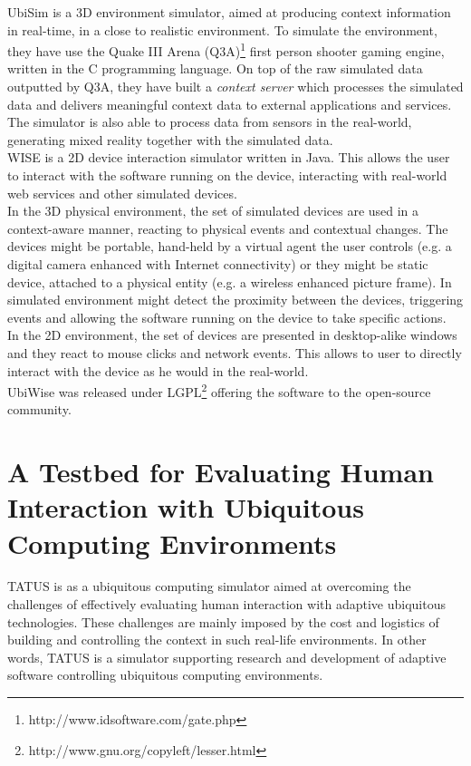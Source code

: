 UbiSim is a 3D environment simulator, aimed at producing context information in real-time, in a close to realistic environment. To simulate the environment, they have use the Quake III Arena (Q3A)\footnote{http://www.idsoftware.com/gate.php} first person shooter gaming engine, written in the C programming language. On top of the raw simulated data outputted by Q3A, they have built a \emph{context server} which processes the simulated data and delivers meaningful context data to external applications and services. The simulator is also able to process data from sensors in the real-world, generating mixed reality together with the simulated data.\\

WISE is a 2D device interaction simulator written in Java. This allows the user to interact with the software running on the device, interacting with real-world web services and other simulated devices.\\

In the 3D physical environment, the set of simulated devices are used in a context-aware manner, reacting to physical events and contextual changes. The devices might be portable, hand-held by a virtual agent the user controls (e.g. a digital camera enhanced with Internet connectivity) or they might be static device, attached to a physical entity (e.g. a wireless enhanced picture frame). In simulated environment might detect the proximity between the devices, triggering events and allowing the software running on the device to take specific actions.\\

In the 2D environment, the set of devices are presented in desktop-alike windows and they react to mouse clicks and network events. This allows to user to directly interact with the device as he would in the real-world.\\

UbiWise was released under LGPL\footnote{http://www.gnu.org/copyleft/lesser.html} offering the software to the open-source community.\\

\section{A Testbed for Evaluating Human Interaction with Ubiquitous Computing Environments}\label{sec:tatus}

TATUS \cite{o2005testbed} is as a ubiquitous computing simulator aimed at overcoming the challenges of effectively evaluating human interaction with adaptive ubiquitous technologies. These challenges are mainly imposed by the cost and logistics of building and controlling the context in such real-life environments. In other words, TATUS is a simulator supporting research and development of adaptive software controlling ubiquitous computing environments.\\

